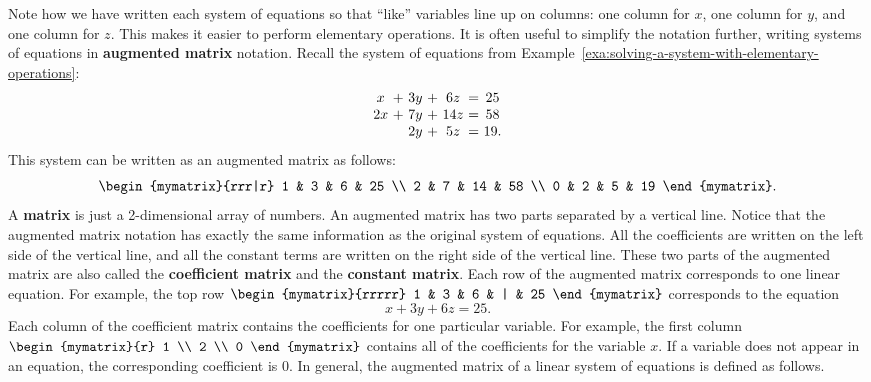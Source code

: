 Note how we have written each system of equations so that ``like''
variables line up on columns: one column for $x$, one column for $y$,
and one column for $z$. This makes it easier to perform elementary
operations. It is often useful to simplify the notation further,
writing systems of equations in \textbf{augmented matrix}%
%
 notation. Recall the
system of equations from Example~\ref{exa:solving-a-system-with-elementary-operations}:
\begin{equation*}
\begin{array}{c@{~}c@{~}c@{~}c@{~}c@{~}c@{~}c}
x&+&3y&+&6z&=&25 \\
2x&+&7y&+&14z&=&58 \\
&&2y&+&5z&=&19.
\end{array}
\end{equation*}
This system can be written as an augmented matrix as follows:
\begin{equation*}
\begin{mymatrix}{rrr|r}
1 & 3 & 6 & 25 \\
2 & 7 & 14 & 58 \\
0 & 2 & 5 & 19
\end{mymatrix}.
\end{equation*}
A \textbf{matrix} is just a 2-dimensional array of
numbers. An augmented matrix has two parts separated by a vertical
line. Notice that the augmented matrix notation has exactly the same
information as the original system of equations. All the coefficients
are written on the left side of the vertical line, and all the
constant terms are written on the right side of the vertical
line. These two parts of the augmented matrix are also called the
\textbf{coefficient matrix}%
 and the \textbf{constant
  matrix}.  Each
row of the augmented matrix corresponds to one linear equation. For
example, the top row $\begin{mymatrix}{rrrrr} 1 & 3 & 6 & | & 25
\end{mymatrix}$
 corresponds to the equation
\begin{equation*}
x+3y+6z=25.
\end{equation*}
Each column of the coefficient matrix contains the coefficients
for one particular variable. For example, the first column $\begin{mymatrix}{r}
1 \\
2 \\
0
\end{mymatrix}$ contains all of the coefficients for the variable $x$. If a
variable does not appear in an equation, the corresponding coefficient
is $0$. In general, the augmented matrix of a linear system of
equations is defined as follows.

